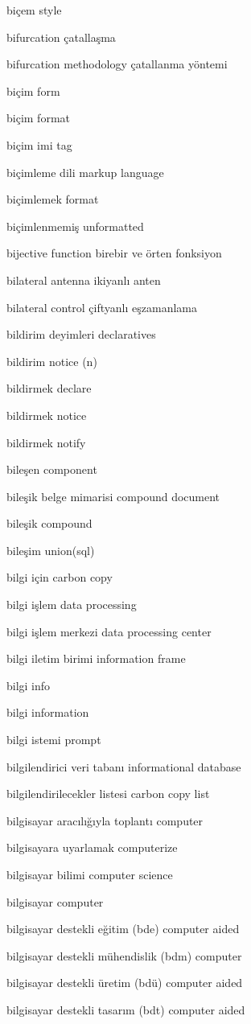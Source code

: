 \documentclass[12pt,fleqn]{article}\usepackage{../../common}
\begin{document}
biçem style

bifurcation çatallaşma

bifurcation methodology çatallanma yöntemi

biçim form

biçim format

biçim imi tag

biçimleme dili markup language

biçimlemek format

biçimlenmemiş unformatted

bijective function birebir ve örten fonksiyon

bilateral antenna ikiyanlı anten

bilateral control çiftyanlı eşzamanlama

bildirim deyimleri declaratives

bildirim notice (n)

bildirmek declare

bildirmek notice

bildirmek notify

bileşen component

bileşik belge mimarisi compound document

bileşik compound

bileşim union(sql)

bilgi için carbon copy

bilgi işlem data processing

bilgi işlem merkezi data processing center

bilgi iletim birimi information frame

bilgi info

bilgi information

bilgi istemi prompt

bilgilendirici veri tabanı informational database

bilgilendirilecekler listesi carbon copy list

bilgisayar aracılığıyla toplantı computer

bilgisayara uyarlamak computerize

bilgisayar bilimi computer science

bilgisayar computer

bilgisayar destekli eğitim (bde) computer aided

bilgisayar destekli mühendislik (bdm) computer

bilgisayar destekli üretim (bdü) computer aided

bilgisayar destekli tasarım (bdt) computer aided
\end{document}
